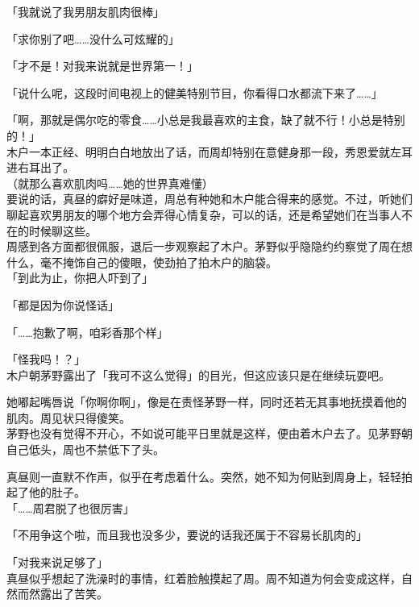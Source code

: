 「我就说了我男朋友肌肉很棒」

「求你别了吧……没什么可炫耀的」

「才不是！对我来说就是世界第一！」

「说什么呢，这段时间电视上的健美特别节目，你看得口水都流下来了……」

「啊，那就是偶尔吃的零食……小总是我最喜欢的主食，缺了就不行！小总是特别的！」\\

木户一本正经、明明白白地放出了话，而周却特别在意健身那一段，秀恩爱就左耳进右耳出了。\\

（就那么喜欢肌肉吗……她的世界真难懂）\\

要说的话，真昼的癖好是味道，周总有种她和木户能合得来的感觉。不过，听她们聊起喜欢男朋友的哪个地方会弄得心情复杂，可以的话，还是希望她们在当事人不在的时候聊这些。\\

周感到各方面都很佩服，退后一步观察起了木户。茅野似乎隐隐约约察觉了周在想什么，毫不掩饰自己的傻眼，使劲拍了拍木户的脑袋。\\

「到此为止，你把人吓到了」

「都是因为你说怪话」

「……抱歉了啊，咱彩香那个样」

「怪我吗！？」\\

木户朝茅野露出了「我可不这么觉得」的目光，但这应该只是在继续玩耍吧。

她嘟起嘴唇说「你啊你啊」，像是在责怪茅野一样，同时还若无其事地抚摸着他的肌肉。周见状只得傻笑。\\

茅野也没有觉得不开心，不如说可能平日里就是这样，便由着木户去了。见茅野朝自己低头，周也不禁低下了头。

真昼则一直默不作声，似乎在考虑着什么。突然，她不知为何贴到周身上，轻轻拍起了他的肚子。\\

「……周君脱了也很厉害」

「不用争这个啦，而且我也没多少，要说的话我还属于不容易长肌肉的」

「对我来说足够了」\\

真昼似乎想起了洗澡时的事情，红着脸触摸起了周。周不知道为何会变成这样，自然而然露出了苦笑。

